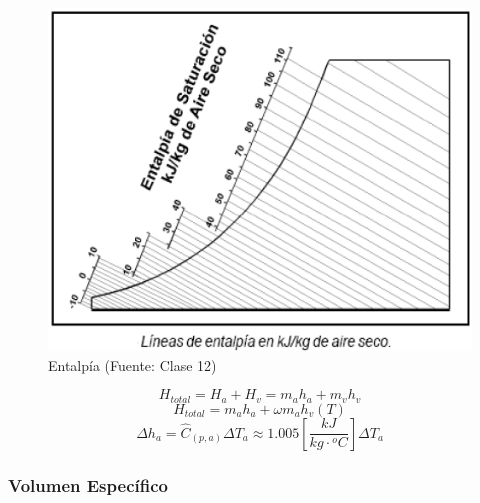         \begin{multicols}{2}
            \begin{figure}
                \includegraphics[width=\textwidth]{img/clases/entalpia_psicrometrico.png}
                \caption{Entalpía (Fuente: Clase 12)}
                \label{fig:entalpia_psicrometrico}
            \end{figure}
            
            \begin{quote}
            \end{quote}
            
            \[H_{total}=H_{a}+H_{v}=m_{a}h_{a} + m_{v}h_{v}\]
            \[H_{total}=m_{a}h_{a} + \omega m_{a}h_{v}(T)\]
            \[\Delta h_{a}=\hat{C}_{(p, a)}\Delta T_{a} \approx 1.005 \left [ \frac{kJ}{kg\cdot {}^{o}C} \right ] \Delta T_{a}\]
        \end{multicols}
        
        \subsubsection{Volumen Específico}
        
